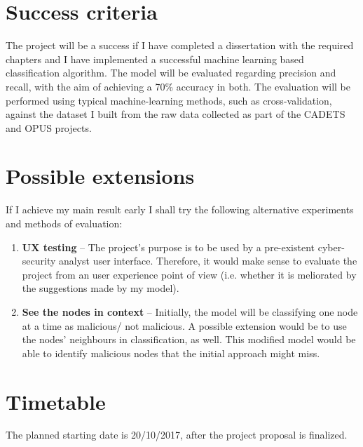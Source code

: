 \section*{Success criteria}

The project will be a success if I have completed a dissertation with the required chapters and I have implemented a successful machine learning based classification algorithm. The model will be evaluated regarding precision and recall, with the aim of achieving a 70\% accuracy in both. The evaluation will be performed using typical machine-learning methods, such as cross-validation, against the dataset I built from the raw data collected as part of the CADETS and OPUS projects.

\section*{Possible extensions}

If I achieve my main result early I shall try the following
alternative experiments and methods of evaluation:

\begin{enumerate}
	\item \textbf{UX testing} -- The project's purpose is to be used by a pre-existent cyber-security analyst user interface. Therefore, it would make sense to evaluate the project from an user experience point of view (i.e. whether it is meliorated by the suggestions made by my model). 
	
	\item \textbf{See the nodes in context} -- Initially, the model will be classifying one node at a time as malicious/ not malicious. A possible extension would be to use the nodes' neighbours in classification, as well. This modified model would be able to identify malicious nodes that the initial approach might miss. 
	
\end{enumerate}

\section*{Timetable}

The planned starting date is 20/10/2017, after the project proposal is finalized.


